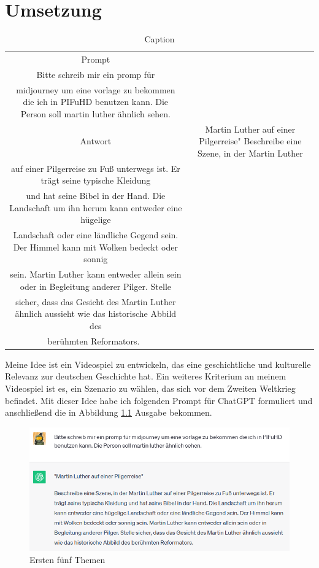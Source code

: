 \chapter{Umsetzung}
\begin{table}
	\centering
	\begin{tabular}{cc}
		Prompt & \\Bitte schreib mir ein promp für \\midjourney um eine vorlage zu bekommen die ich in PIFuHD benutzen kann. Die Person soll martin luther ähnlich sehen.\\
		Antwort & \"Martin Luther auf einer Pilgerreise" Beschreibe eine Szene, in der Martin Luther\\ auf einer Pilgerreise zu Fuß unterwegs ist. Er trägt seine typische Kleidung\\ und hat seine Bibel in der Hand. Die Landschaft um ihn herum kann entweder eine hügelige\\ Landschaft oder eine ländliche Gegend sein. Der Himmel kann mit Wolken bedeckt oder sonnig\\ sein. Martin Luther kann entweder allein sein oder in Begleitung anderer Pilger. Stelle\\ sicher, dass das Gesicht des Martin Luther ähnlich aussieht wie das historische Abbild des\\ berühmten Reformators.\
	\end{tabular}
	\caption{Caption}
	\label{tab:my_label}
\end{table}
Meine Idee ist ein Videospiel zu entwickeln, das eine geschichtliche und kulturelle Relevanz zur deutschen Geschichte hat. Ein weiteres Kriterium an meinem Videospiel ist es, ein Szenario zu wählen, das sich vor dem Zweiten Weltkrieg befindet. Mit dieser Idee habe ich folgenden Prompt für ChatGPT formuliert und anschließend die in Abbildung \ref{ersten-5-themen} Ausgabe bekommen.
\begin{figure}[h]
	\centering
	\includegraphics[width=14cm]{BilderFuerBA/01.png}
	\caption{Ersten fünf Themen}
	\label{ersten-5-themen}
\end{figure}
